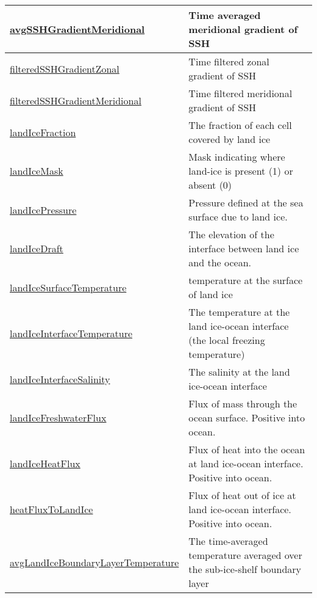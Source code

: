 {\begin{center}
\begin{longtable}{| p{2.0in} | p{4.0in} |}
    \hline
    \hyperref[subsec:var_sec_forcing_avgSSHGradientMeridional]{avgSSHGradientMeridional} & Time averaged meridional gradient of SSH \\
    \hline
    \hyperref[subsec:var_sec_forcing_filteredSSHGradientZonal]{filteredSSHGradientZonal} & Time filtered zonal gradient of SSH \\
    \hline
    \hyperref[subsec:var_sec_forcing_filteredSSHGradientMeridional]{filteredSSHGradientMeridional} & Time filtered meridional gradient of SSH \\
    \hline
    \hyperref[subsec:var_sec_forcing_landIceFraction]{landIceFraction} & The fraction of each cell covered by land ice \\
    \hline
    \hyperref[subsec:var_sec_forcing_landIceMask]{landIceMask} & Mask indicating where land-ice is present (1) or absent (0) \\
    \hline
    \hyperref[subsec:var_sec_forcing_landIcePressure]{landIcePressure} & Pressure defined at the sea surface due to land ice. \\
    \hline
    \hyperref[subsec:var_sec_forcing_landIceDraft]{landIceDraft} & The elevation of the interface between land ice and the ocean. \\
    \hline
    \hyperref[subsec:var_sec_forcing_landIceSurfaceTemperature]{landIceSurfaceTemperature} & temperature at the surface of land ice \\
    \hline
    \hyperref[subsec:var_sec_forcing_landIceInterfaceTemperature]{landIceInterfaceTemperature} & The temperature at the land ice-ocean interface (the local freezing temperature) \\
    \hline
    \hyperref[subsec:var_sec_forcing_landIceInterfaceSalinity]{landIceInterfaceSalinity} & The salinity at the land ice-ocean interface \\
    \hline
    \hyperref[subsec:var_sec_forcing_landIceFreshwaterFlux]{landIceFreshwaterFlux} & Flux of mass through the ocean surface. Positive into ocean. \\
    \hline
    \hyperref[subsec:var_sec_forcing_landIceHeatFlux]{landIceHeatFlux} & Flux of heat into the ocean at land ice-ocean interface. Positive into ocean. \\
    \hline
    \hyperref[subsec:var_sec_forcing_heatFluxToLandIce]{heatFluxToLandIce} & Flux of heat out of ice at land ice-ocean interface. Positive into ocean. \\
    \hline
    \hyperref[subsec:var_sec_forcing_avgLandIceBoundaryLayerTemperature]{avgLandIceBoundaryLayer\-Temperature} & The time-averaged temperature averaged over the sub-ice-shelf boundary layer \\

\end{longtable}
\end{center}}
